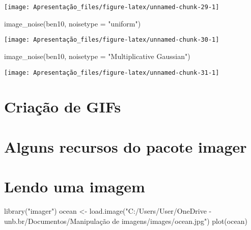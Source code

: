\documentclass[
]{article}
\newenvironment{Shaded}{\begin{snugshade}}{\end{snugshade}}
\newcommand{\AttributeTok}[1]{\textcolor[rgb]{0.77,0.63,0.00}{#1}}
\newcommand{\FunctionTok}[1]{\textcolor[rgb]{0.00,0.00,0.00}{#1}}
\newcommand{\NormalTok}[1]{#1}
\newcommand{\OtherTok}[1]{\textcolor[rgb]{0.56,0.35,0.01}{#1}}
\newcommand{\StringTok}[1]{\textcolor[rgb]{0.31,0.60,0.02}{#1}}
\begin{document}
\texttt{[image: Apresentação\_files/figure-latex/unnamed-chunk-29-1]}

\begin{Shaded}
\begin{Highlighting}[]
\FunctionTok{image\_noise}\NormalTok{(ben10, }\AttributeTok{noisetype =} \StringTok{"uniform"}\NormalTok{)}
\end{Highlighting}
\end{Shaded}

\texttt{[image: Apresentação\_files/figure-latex/unnamed-chunk-30-1]}

\begin{Shaded}
\begin{Highlighting}[]
\FunctionTok{image\_noise}\NormalTok{(ben10, }\AttributeTok{noisetype =} \StringTok{"Multiplicative Gaussian"}\NormalTok{)}
\end{Highlighting}
\end{Shaded}

\texttt{[image: Apresentação\_files/figure-latex/unnamed-chunk-31-1]}

\hypertarget{criauxe7uxe3o-de-gifs}{%
\section{Criação de GIFs}\label{criauxe7uxe3o-de-gifs}}

\hypertarget{alguns-recursos-do-pacote-imager}{%
\section{Alguns recursos do pacote
imager}\label{alguns-recursos-do-pacote-imager}}

\hypertarget{lendo-uma-imagem}{%
\section{Lendo uma imagem}\label{lendo-uma-imagem}}

\begin{Shaded}
\begin{Highlighting}[]
\FunctionTok{library}\NormalTok{(}\StringTok{"imager"}\NormalTok{)}
\NormalTok{ocean }\OtherTok{\textless{}{-}} \FunctionTok{load.image}\NormalTok{(}\StringTok{"C:/Users/User/OneDrive {-} unb.br/Documentos/Manipulação de imagens/images/ocean.jpg"}\NormalTok{)}
\FunctionTok{plot}\NormalTok{(ocean)}
\end{Highlighting}
\end{Shaded}
\end{document}
